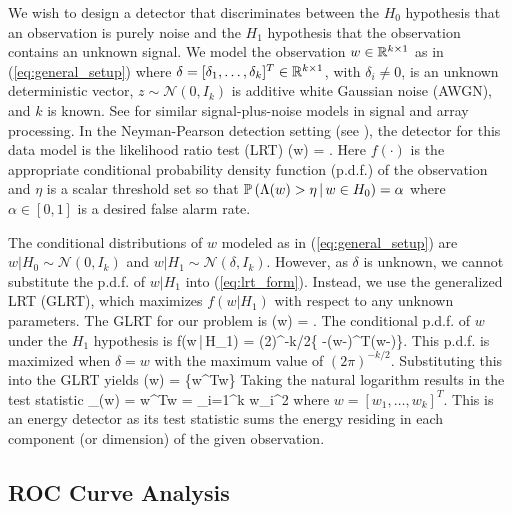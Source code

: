 We wish to design a detector that discriminates between the $H_0$ hypothesis that an
observation is purely noise and the $H_1$ hypothesis that the observation contains an
unknown signal.  We model the observation $w\in\mathbb{R}^{k\times 1}$ as in
(\ref{eq:general_setup}) where $\delta=[\delta_1,\dots,\delta_k]^T\in\mathbb{R}^{k\times 1}$,
with $\delta_i\neq 0$, is an unknown deterministic vector,
$z\sim\mathcal{N}\left(0,I_k\right)$ is additive white Gaussian noise (AWGN), and $k$ is
known. See
\cite{cui2013performance,santiago2013noise,arribas2013antenna,chen2013adaptive,gorji2013widely,zhou2013space,kwon2013multi,hu2013doa,liao2013direction}
for similar signal-plus-noise models in signal and array processing.  In the
Neyman-Pearson detection setting (see \cite{van1968detection}), the detector for this data
model is the likelihood ratio test (LRT)
\beq\label{eq:lrt_form}
\Lambda(w) =  \detgtrless \eta.
\eeq
Here $f\left(\cdot\right)$ is the appropriate conditional probability density function
(p.d.f.) of the observation and $\eta$ is a scalar threshold set so that $\mathbb{P}\left({\Lambda(w)
  > \eta\,|\, w\in H_0}\right) = \alpha$ where $\alpha\in[0,1]$ is a desired false alarm rate.

The conditional distributions of $w$ modeled as in (\ref{eq:general_setup}) are
$w|H_0\sim\mathcal{N}\left(0,I_k\right)$ and
$w|H_1\sim\mathcal{N}\left(\delta,I_k\right)$. However, as $\delta$ is unknown, we cannot
substitute the p.d.f. of $w|H_1$ into (\ref{eq:lrt_form}). Instead, we use the generalized
LRT (GLRT), which maximizes $f(w|H_1)$ with respect to any unknown parameters. The GLRT
for our problem is 
\be \Lambda(w) =  \detgtrless \eta.  
\ee
The conditional p.d.f. of $w$ under the $H_1$ hypothesis is
\be
f\left(w\,|\,H_1\right) = \left(2\pi\right)^{-k/2}\exp\left\{ -\left(w-\delta\right)^T\left(w-\delta\right)\right\}.
\ee
This p.d.f. is maximized when $\delta=w$ with the maximum value of
$(2\pi)^{-k/2}$. Substituting this into the GLRT yields
\be
\Lambda(w) = \exp\{w^Tw\}
\ee
Taking the natural logarithm results in the test statistic
\beq\label{eq:energy_detector}
\Lambda_{}(w) = w^Tw = \sum_{i=1}^k w_i^2
\eeq
where $w=[w_1,\dots,w_k]^T$. This is an energy detector as its test statistic sums the
energy residing in each component (or dimension) of the given observation.

\subsection{ROC Curve Analysis}

